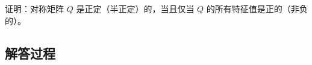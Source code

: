\begin{example}[对称矩阵正定性判定]
    证明：对称矩阵 \(Q\) 是正定（半正定）的，当且仅当 \(Q\) 的所有特征值是正的（非负的）。
    \end{example}
    
    \subsection*{解答过程}
    